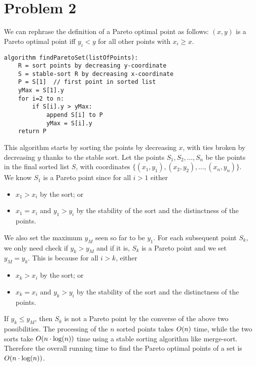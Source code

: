 \documentclass[11pt]{article}
\newcounter{problemnumber}
\let\origleft\left
\let\origright\right
\renewcommand{\left}{\mathopen{}\mathclose\bgroup\origleft}
\renewcommand{\right}{\aftergroup\egroup\origright}
\newcommand{\p}[1]{\left(#1\right)}
\renewcommand{\log}[1]{\text{log}\p{#1}}
\newcommand{\BigOh}[1]{O\p{#1}}
\begin{document}
\section*{Problem 2}
We can rephrase the definition of a Pareto optimal point as follows: $(x,y)$ is a Pareto optimal point iff $y_i<y$ for all other points with $x_i \geq x$.
\begin{verbatim}
algorithm findParetoSet(listOfPoints):
    R = sort points by decreasing y-coordinate
    S = stable-sort R by decreasing x-coordinate
    P = S[1]  // first point in sorted list
    yMax = S[1].y
    for i=2 to n:
        if S[i].y > yMax:
            append S[i] to P
            yMax = S[i].y
    return P
\end{verbatim}
This algorithm starts by sorting the points by decreasing $x$, with ties broken by decreasing $y$ thanks to the stable sort. Let the points $S_1,S_2,\ldots,S_n$ be the points in the final sorted list $S$, with coordinates $\{(x_1,y_1),(x_2,y_2),\ldots,(x_n,y_n)\}$. We know $S_1$ is a Pareto point since for all $i>1$ either
\begin{itemize}
\item $x_1 > x_i$ by the sort; or \\
\item $x_1 = x_i$ and $y_1 > y_i$ by the stability of the sort and the distinctness of the points.
\end{itemize}
We also set the maximum $y_M$ seen so far to be $y_1$. For each subsequent point $S_k$, we only need check if $y_k > y_M$ and if it is, $S_k$ is a Pareto point and we set $y_M = y_k$. This is because for all $i>k$, either
\begin{itemize}
\item $x_k > x_i$ by the sort; or \\
\item $x_k = x_i$ and $y_k > y_i$ by the stability of the sort and the distinctness of the points.
\end{itemize}
If $y_k \leq y_M$, then $S_k$ is not a Pareto point by the converse of the above two possibilities. The processing of the $n$ sorted points takes $\BigOh{n}$ time, while the two sorts take $\BigOh{n\cdot\log n}$ time using a stable sorting algorithm like merge-sort. Therefore the overall running time to find the Pareto optimal points of a set is $\BigOh{n\cdot\log n}$.


\newpage
\end{document}
